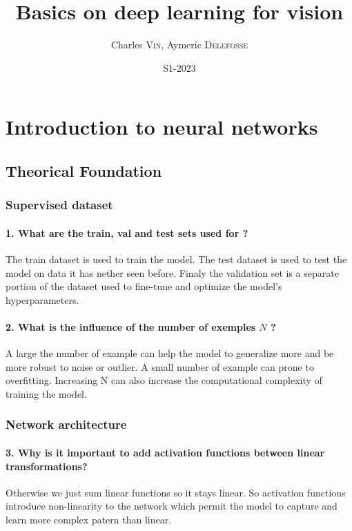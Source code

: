 \documentclass{article}
\title{Basics on deep learning for vision}
\author{Charles \textsc{Vin}, Aymeric \textsc{Delefosse}}
\date{S1-2023}
\theoremstyle{plain}%
\theoremstyle{definition}
\theoremstyle{remark}
\begin{document}
\maketitle

\section{Introduction to neural networks}
\subsection{Theorical Foundation}
\subsubsection{Supervised dataset}
\paragraph{1. What are the train, val and test sets used for ?}
The train dataset is used to train the model. The test dataset is used to test the model on data it has nether seen before. Finaly the validation set is a separate portion of the dataset used to fine-tune and optimize the model's hyperparameters.

\paragraph{2. What is the influence of the number of exemples $N$ ?}
A large the number of example can help the model to generalize more and be more robust to noise or outlier. A small number of example can prone to overfitting. Increasing N can also increase the computational complexity of training the model.

\subsubsection{Network architecture}
\paragraph{3. Why is it important to add activation functions between linear transformations?}
Otherwise we just sum linear functions so it stays linear. So activation functions introduce non-linearity to the network which permit the model to capture and learn more complex patern than linear. 
\end{document}
